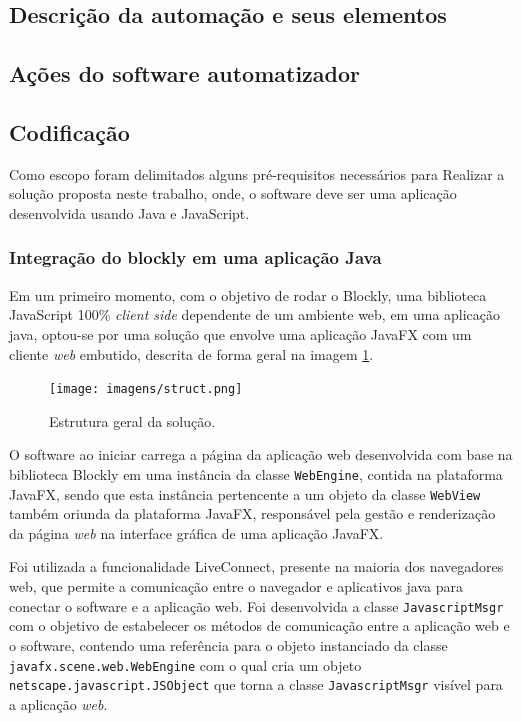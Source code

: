 \documentclass[tg]{mdtufsm}
\begin{document}
            \subsection {Descrição da automação e seus elementos}

            \subsection {Ações do software automatizador}

            \subsection {Codificação}

                Como escopo foram delimitados alguns pré-requisitos necessários para Realizar a solução proposta neste trabalho, onde, o software deve ser uma aplicação desenvolvida usando Java e JavaScript.

                \subsubsection {Integração do blockly em uma aplicação Java}

                    Em um primeiro momento, com o objetivo de rodar o Blockly, uma biblioteca JavaScript 100\% \emph{client side} dependente de um ambiente web, em uma aplicação java, optou-se por uma solução que envolve uma aplicação JavaFX com um cliente \emph{web} embutido, descrita de forma geral na imagem \ref{fig:struct}.

                    \begin{figure}[!htb]
                        {\centering
                        \texttt{[image: imagens/struct.png]}
                        \caption{Estrutura geral da solução.}
                        \label{fig:struct}}
                    \end{figure}

                    O software ao iniciar carrega a página da aplicação web desenvolvida com base na biblioteca Blockly em uma instância da classe \texttt{WebEngine}, contida na plataforma JavaFX, sendo que esta instância pertencente a um objeto da classe \texttt{WebView} também oriunda da plataforma JavaFX, responsável pela gestão e renderização da página \emph{web} na interface gráfica de uma aplicação JavaFX.

                    Foi utilizada a funcionalidade LiveConnect, presente na maioria dos navegadores web, que permite a comunicação entre o navegador e aplicativos java para conectar o software e a aplicação web. Foi desenvolvida a classe \texttt{JavascriptMsgr} com o objetivo de estabelecer os métodos de comunicação entre a aplicação web e o software, contendo uma referência para o objeto instanciado da classe \texttt{javafx.scene.web.WebEngine} com o qual cria um objeto \texttt{netscape.javascript.JSObject} que torna a classe \texttt{JavascriptMsgr} visível para a aplicação \emph{web}.
\end{document}
